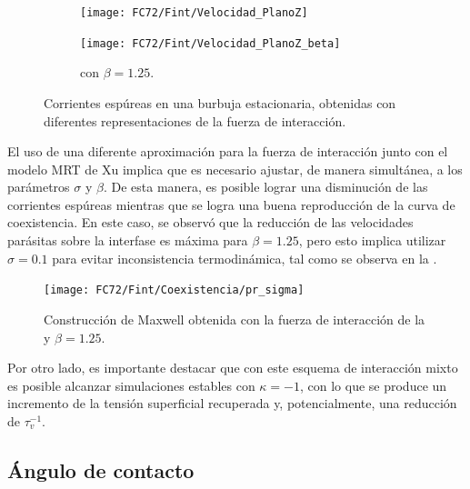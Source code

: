 \begin{figure}[htb]
    \centering
    \begin{subfigure}[t]{0.45\textwidth}
        \centering
        \texttt{[image: FC72/Fint/Velocidad\_PlanoZ]}
        \caption{}
    \end{subfigure}
    \begin{subfigure}[t]{0.45\textwidth}
        \centering
        \texttt{[image: FC72/Fint/Velocidad\_PlanoZ\_beta]}
        \caption{ con $\beta=1.25$. }
    \end{subfigure}    
    \caption{Corrientes esp\'ureas en una burbuja estacionaria, obtenidas con diferentes representaciones de la fuerza de interacci\'on.}
    \label{fig:fuerza_int}
\end{figure}

El uso de una diferente aproximaci\'on para la fuerza de interacci\'on junto con el modelo MRT de Xu implica que es necesario ajustar, de manera simult\'anea, a los par\'ametros $\sigma$ y $\beta$. De esta manera, es posible lograr una disminuci\'on de las corrientes esp\'ureas mientras que se logra una buena reproducci\'on de la curva de coexistencia. En este caso, se observ\'o que la reducci\'on de las velocidades par\'asitas sobre la interfase es m\'axima para $\beta=1.25$, pero esto implica utilizar $\sigma=0.1$ para evitar inconsistencia termodin\'amica, tal como se observa en la .

\begin{figure}[ht]
	\centering
	\texttt{[image: FC72/Fint/Coexistencia/pr\_sigma]}
	\caption{Construcci\'on de Maxwell obtenida con la fuerza de interacci\'on de la  y $\beta=1.25$.}
	\label{fig:pr_sigma_beta}
\end{figure}
\FloatBarrier

Por otro lado, es importante destacar que con este esquema de interacci\'on mixto es posible alcanzar simulaciones estables con $\kappa=-1$, con lo que se produce un incremento de la tensi\'on superficial recuperada y, potencialmente, una reducci\'on de $\tau_v^{-1}$.




\subsection{\'Angulo de contacto}

